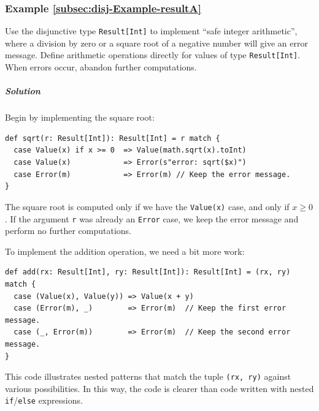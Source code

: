 \subsubsection{Example \label{subsec:disj-Example-resultA}\ref{subsec:disj-Example-resultA}}

Use the disjunctive type \lstinline!Result[Int]! to implement ``safe
integer arithmetic'', where a division by zero or a square root of
a negative number will give an error message. Define arithmetic operations
directly for values of type \lstinline!Result[Int]!. When errors
occur, abandon further computations.

\subparagraph{Solution}

Begin by implementing the square root:
\begin{lstlisting}
def sqrt(r: Result[Int]): Result[Int] = r match {
  case Value(x) if x >= 0  => Value(math.sqrt(x).toInt)
  case Value(x)            => Error(s"error: sqrt($x)")
  case Error(m)            => Error(m) // Keep the error message.
}
\end{lstlisting}
The square root is computed only if we have the \lstinline!Value(x)!
case, and only if $x\geq0$. If the argument \lstinline!r! was already
an \lstinline!Error! case, we keep the error message and perform
no further computations.

To implement the addition operation, we need a bit more work:
\begin{lstlisting}
def add(rx: Result[Int], ry: Result[Int]): Result[Int] = (rx, ry) match {
  case (Value(x), Value(y)) => Value(x + y)
  case (Error(m), _)        => Error(m)  // Keep the first error message.
  case (_, Error(m))        => Error(m)  // Keep the second error message.
}
\end{lstlisting}
This code illustrates nested patterns that match the tuple \lstinline!(rx, ry)!
against various possibilities. In this way, the code is clearer than
code written with nested \lstinline!if!/\lstinline!else! expressions.

